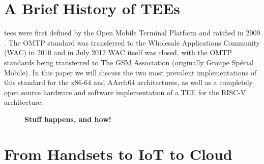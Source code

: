 \section{A Brief History of TEEs}
\glspl{tee} were first defined by the Open Mobile Terminal Platform and ratified in 2009 \cite{Confidential2009}. The OMTP standard was transferred to the Wholesale Applications Community (WAC) in 2010 and in July 2012 WAC itself was closed, with the OMTP standards being transferred to The GSM Association (originally Groupe Spécial Mobile)\cite{WAC}. In this paper we will discuss the two most prevalent implementations of this standard for the x86-64 and AArch64 architectures, as well as a completely open source hardware and software implementation of a TEE for the RISC-V architecture.

\begin{figure}[htbp]
\centering

\caption[Hardware Security Timeline]{\textbf{Stuff happens, and how!}}
\label{fig:sec-timeline}
\end{figure}

\section{From Handsets to IoT to Cloud}